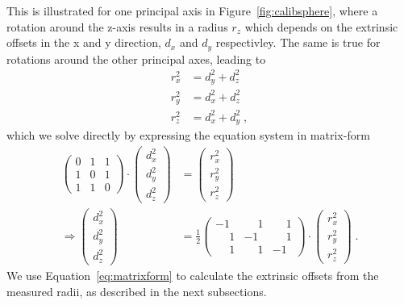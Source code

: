 This is illustrated for one principal axis in Figure~\ref{fig:calibsphere}, where a rotation around the z-axis results in a radius $r_z$ which depends on the extrinsic offsets in the x and y direction, $d_x$ and $d_y$ respectivley.
The same is true for rotations around the other principal axes, leading to  
\begin{align}
  r_x^2 &= d_y^2 + d_z^2 \nonumber \\
  r_y^2 &= d_x^2 + d_z^2 \nonumber \\
  r_z^2 &= d_x^2 + d_y^2 \;,
  \label{eq:equationsystem}
\end{align}
which we solve directly by expressing the equation system in matrix-form
\begin{align}
  \begin{pmatrix}
    0 & 1 & 1 \\
    1 & 0 & 1 \\
    1 & 1 & 0
  \end{pmatrix}
  \cdot 
  \begin{pmatrix}
    d_x^2 \\
    d_y^2 \\
    d_z^2
  \end{pmatrix}
  &= 
  \begin{pmatrix}
    r_x^2 \\
    r_y^2 \\
    r_z^2
  \end{pmatrix} \nonumber \\
  \Rightarrow
  \begin{pmatrix}
    d_x^2 \\
    d_y^2 \\
    d_z^2
  \end{pmatrix}
  &= \frac{1}{2}
  \begin{pmatrix}
    -1 & \phantom{-}1 & \phantom{-}1 \\
    \phantom{-}1 & -1 & \phantom{-}1 \\
    \phantom{-}1 &  \phantom{-}1 & -1
  \end{pmatrix} 
  \cdot 
  \begin{pmatrix}
    r_x^2 \\
    r_y^2 \\
    r_z^2
  \end{pmatrix}\;.
  \label{eq:matrixform}
\end{align}
We use Equation~\eqref{eq:matrixform} to calculate the extrinsic offsets from the measured radii, as described in the next subsections.

